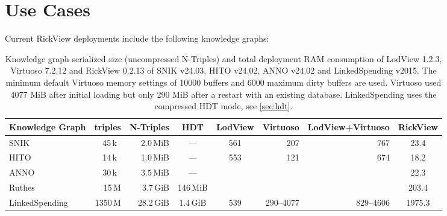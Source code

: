 \documentclass{ceurart}
\begin{document}
\section{Use Cases}
Current RickView deployments include the following knowledge graphs:

\begin{table}
\begin{tabular}{lrrcSrrS}
\toprule
Knowledge Graph	&\textnormal{triples}		&\textnormal{N-Triples}	&\textnormal{HDT}	&\textnormal{LodView}	&\textnormal{Virtuoso}	&\textnormal{LodView+Virtuoso}	&\textnormal{RickView}\\
\midrule
SNIK	 		&45\,k~						&2.0\,MiB				& ---				&561					&207					&767							&23.4\\
HITO 			&14\,k~						&1.0\,MiB				& ---				&553					&121					&674							&18.2\\
ANNO			&30\,k~						&3.5\,MiB				& ---				&						&						&								&22.3\\
Ruthes			&15\,M						&3.7\,GiB				&146\,MiB			&						&						&								&203.4\\
LinkedSpending	&1350\,M					&28.2\,GiB				&1.4\,GiB			&539					&290--4077				&829--4606						&1975.3\\
\bottomrule
\end{tabular}
\label{tab:stats}
\caption{Knowledge graph serialized size (uncompressed N-Triples) and total deployment RAM consumption of LodView 1.2.3, Virtuoso 7.2.12 and RickView 0.2.13 of SNIK v24.03, HITO v24.02, ANNO v24.02 and LinkedSpending v2015.
The minimum default Virtuoso memory settings of 10000 buffers and 6000 maximum dirty buffers are used.
Virtuoso used 4077 MiB after initial loading but only 290 MiB after a restart with an existing database.
LinkedSpending uses the compressed HDT mode, see \cref{sec:hdt}.
}
\end{table}
\end{document}
